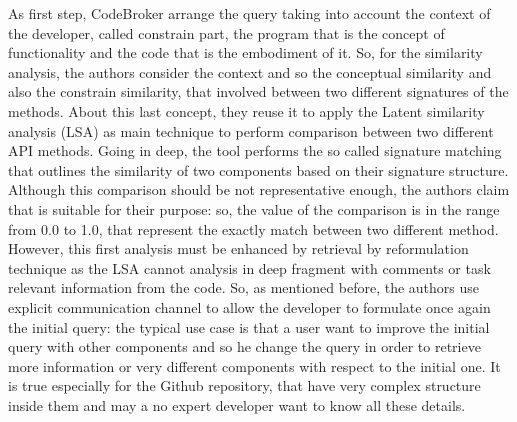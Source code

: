 As first step, CodeBroker arrange the query taking into account the context of the developer, called constrain part, the program that is the concept of functionality and the code that is the embodiment of it. So, for the similarity analysis, the authors consider the context and so the conceptual similarity and also the constrain similarity, that involved between two different signatures of the methods. About this last concept, they reuse it to apply the Latent similarity analysis (LSA) as main technique to perform comparison between two different API methods. Going in deep, the tool performs the so called signature matching that outlines the similarity of two components based on their signature structure. Although this comparison should be not representative enough, the authors claim that is suitable for their purpose: so, the value of the comparison is in the range from 0.0 to 1.0, that represent the exactly match between two different method. However, this first analysis must be enhanced by retrieval by reformulation technique as the LSA cannot analysis in deep fragment with comments or task relevant information from the code. So, as mentioned before, the authors use explicit communication channel to allow the developer to formulate once again the initial query: the typical use case is that a user want to improve the initial query with other components and so he change the query in order to retrieve more information or very different components with respect to the initial one. It is true especially for the Github repository, that have very complex structure inside them and may a no expert developer want to know all these details. \\
